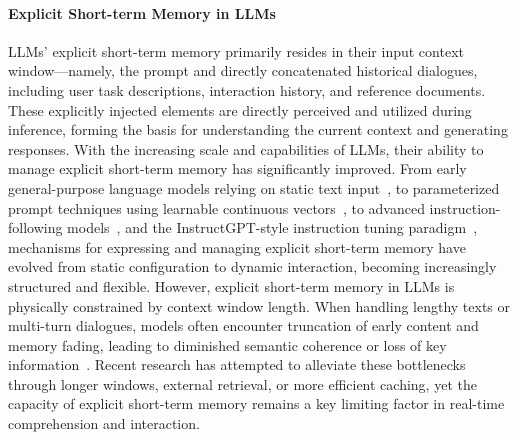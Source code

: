 \documentclass[]{memtensor}
\begin{document}
\paragraph{\textbf{Explicit Short-term Memory in LLMs}}
LLMs' explicit short-term memory primarily resides in their input context window—namely, the prompt and directly concatenated historical dialogues, including user task descriptions, interaction history, and reference documents. These explicitly injected elements are directly perceived and utilized during inference, forming the basis for understanding the current context and generating responses.
With the increasing scale and capabilities of LLMs, their ability to manage explicit short-term memory has significantly improved. From early general-purpose language models relying on static text input~\cite{radford_gpt2_nodate,brown_gpt3_2020}, to parameterized prompt techniques using learnable continuous vectors~\cite{li_prefix-tuning_2021,lester_prompt-tuning_2021,liu_ptuning_2023,liu_ptuningv2_2022}, to advanced instruction-following models~\cite{touvron_llama_2023,touvron_llama2_2023,ye_chatgpt_2023}, and the InstructGPT-style instruction tuning paradigm~\cite{ouyang_instructgpt_2022}, mechanisms for expressing and managing explicit short-term memory have evolved from static configuration to dynamic interaction, becoming increasingly structured and flexible.
However, explicit short-term memory in LLMs is physically constrained by context window length. When handling lengthy texts or multi-turn dialogues, models often encounter truncation of early content and memory fading, leading to diminished semantic coherence or loss of key information~\cite{liu_lost_2024,dong_longsurvey_2024}. Recent research has attempted to alleviate these bottlenecks through longer windows, external retrieval, or more efficient caching, yet the capacity of explicit short-term memory remains a key limiting factor in real-time comprehension and interaction.
\end{document}
